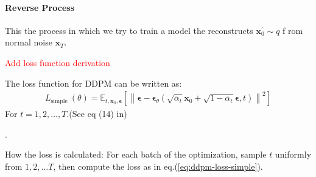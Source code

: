 \documentclass[11pt]{article}
\begin{document}
    \paragraph{Reverse Process}
    This the process in which we try to train a model the reconstructs $\mathbf{x}^{'}_0 \sim q$ f
    rom normal noise $\mathbf{x}_T$.\par
    \textcolor{red}{Add loss function derivation}\par
    The loss function for DDPM can be written as:
    \begin{equation}
        \begin{aligned}
            L_{\text {simple }}(\theta) =\mathbb{E}_{t, \mathbf{x}_0,
            \boldsymbol{\epsilon}}\left[\left\|\boldsymbol{\epsilon}-\boldsymbol{\epsilon}_
            \theta\left(\sqrt{\bar{\alpha}_t}
            \mathbf{x}_0+\sqrt{1-\bar{\alpha}_t}
            \boldsymbol{\epsilon}, t\right)\right\|^2\right]
        \end{aligned}
        \label{eq:ddpm-loss-simple}
    \end{equation}
    For $t=1,2,\dots,T$.(See eq (14) in\cite{ho2020denoising})\par.

    How the loss is calculated: For each batch of the optimization, sample $t$ uniformly from $1,2,\dots T$, then compute
    the loss as in eq.(\ref{eq:ddpm-loss-simple}).
\end{document}
